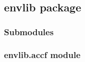 \documentclass[a4paper,11pt,english]{sphinxmanual}
\begin{document}
\subsection{envlib package}
\label{\detokenize{envlib:envlib-package}}\label{\detokenize{envlib::doc}}

\subsubsection{Submodules}
\label{\detokenize{envlib:submodules}}

\subsubsection{envlib.accf module}
\label{\detokenize{envlib:module-envlib.accf}}\label{\detokenize{envlib:envlib-accf-module}}
\end{document}
